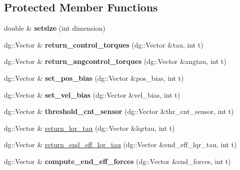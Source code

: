 \subsection*{Protected Member Functions}
\begin{DoxyCompactItemize}
\item 
double \& {\bfseries setsize} (int dimension)\hypertarget{classdynamicgraph_1_1sot_1_1ComImpedanceControl_a347f5be0bd9167793b5ca5cfe1fcee1b}{}\label{classdynamicgraph_1_1sot_1_1ComImpedanceControl_a347f5be0bd9167793b5ca5cfe1fcee1b}

\item 
dg\+::\+Vector \& {\bfseries return\+\_\+control\+\_\+torques} (dg\+::\+Vector \&tau, int t)\hypertarget{classdynamicgraph_1_1sot_1_1ComImpedanceControl_a7b2c7270cb18bd1856f11c86b7937ab3}{}\label{classdynamicgraph_1_1sot_1_1ComImpedanceControl_a7b2c7270cb18bd1856f11c86b7937ab3}

\item 
dg\+::\+Vector \& {\bfseries return\+\_\+angcontrol\+\_\+torques} (dg\+::\+Vector \&angtau, int t)\hypertarget{classdynamicgraph_1_1sot_1_1ComImpedanceControl_a3069704cb14b9729d52b97f4466f82e8}{}\label{classdynamicgraph_1_1sot_1_1ComImpedanceControl_a3069704cb14b9729d52b97f4466f82e8}

\item 
dg\+::\+Vector \& {\bfseries set\+\_\+pos\+\_\+bias} (dg\+::\+Vector \&pos\+\_\+bias, int t)\hypertarget{classdynamicgraph_1_1sot_1_1ComImpedanceControl_aead1e61d4ffea75a0f0036b086f8fd8a}{}\label{classdynamicgraph_1_1sot_1_1ComImpedanceControl_aead1e61d4ffea75a0f0036b086f8fd8a}

\item 
dg\+::\+Vector \& {\bfseries set\+\_\+vel\+\_\+bias} (dg\+::\+Vector \&vel\+\_\+bias, int t)\hypertarget{classdynamicgraph_1_1sot_1_1ComImpedanceControl_a0b09ed32454cbecee116b2ac229a7b44}{}\label{classdynamicgraph_1_1sot_1_1ComImpedanceControl_a0b09ed32454cbecee116b2ac229a7b44}

\item 
dg\+::\+Vector \& {\bfseries threshold\+\_\+cnt\+\_\+sensor} (dg\+::\+Vector \&thr\+\_\+cnt\+\_\+sensor, int t)\hypertarget{classdynamicgraph_1_1sot_1_1ComImpedanceControl_a5bf7ea6d98e8aba42ec6fa782fbe0b4c}{}\label{classdynamicgraph_1_1sot_1_1ComImpedanceControl_a5bf7ea6d98e8aba42ec6fa782fbe0b4c}

\item 
dg\+::\+Vector \& \hyperlink{classdynamicgraph_1_1sot_1_1ComImpedanceControl_a6c33c88c2a5ae61dbde00dbd001355ca}{return\+\_\+lqr\+\_\+tau} (dg\+::\+Vector \&lqrtau, int t)
\item 
dg\+::\+Vector \& \hyperlink{classdynamicgraph_1_1sot_1_1ComImpedanceControl_a3df6780c7565af64536541c04c7e55f4}{return\+\_\+end\+\_\+eff\+\_\+lqr\+\_\+tau} (dg\+::\+Vector \&end\+\_\+eff\+\_\+lqr\+\_\+tau, int t)
\item 
dg\+::\+Vector \& {\bfseries compute\+\_\+end\+\_\+eff\+\_\+forces} (dg\+::\+Vector \&end\+\_\+forces, int t)\hypertarget{classdynamicgraph_1_1sot_1_1ComImpedanceControl_ad490f975131e2a420778e843e7b76c81}{}\label{classdynamicgraph_1_1sot_1_1ComImpedanceControl_ad490f975131e2a420778e843e7b76c81}


\end{DoxyCompactItemize}
